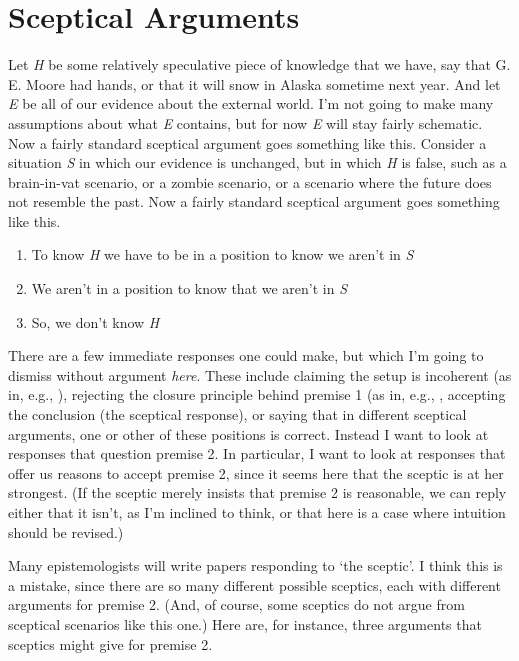 \section{Sceptical Arguments}

Let \textit{H} be some relatively speculative piece of knowledge that we have, say that G. E. Moore had hands, or that it will snow in Alaska sometime next year. And let \textit{E} be all of our evidence about the external world. I'm not going to make many assumptions about what \textit{E} contains, but for now \textit{E} will stay fairly schematic. Now a fairly standard sceptical argument goes something like this. Consider a situation \textit{S} in which our evidence is unchanged, but in which \textit{H} is false, such as a brain-in-vat scenario, or a zombie scenario, or a scenario where the future does not resemble the past. Now a fairly standard sceptical argument goes something like this.

\noindent \begin{minipage}{\textwidth}
\renewcommand{\labelenumi}{\arabic{enumi}.}
\begin{enumerate}
\item To know \textit{H} we have to be in a position to know we aren't in \textit{S}
\item We aren't in a position to know that we aren't in \textit{S}
\item So, we don't know \textit{H}
\end{enumerate}
\end{minipage}

\noindent There are a few immediate responses one could make, but which I'm going to dismiss without argument \textit{here}. These include claiming the setup is incoherent (as in, e.g., \citet{Williamson2000-WILKAI}), rejecting the closure principle behind premise 1 (as in, e.g., \citet{Dretske1971}, accepting the conclusion (the sceptical response), or saying that in different sceptical arguments, one or other of these positions is correct. Instead I want to look at responses that question premise 2. In particular, I want to look at responses that offer us reasons to accept premise 2, since it seems here that the sceptic is at her strongest. (If the sceptic merely insists that premise 2 is reasonable, we can reply either that it isn't, as I'm inclined to think, or that here is a case where intuition should be revised.)

Many epistemologists will write papers responding to `the sceptic'. I think this is a mistake, since there are so many different possible sceptics, each with different arguments for premise 2. (And, of course, some sceptics do not argue from sceptical scenarios like this one.) Here are, for instance, three arguments that sceptics might give for premise 2.

